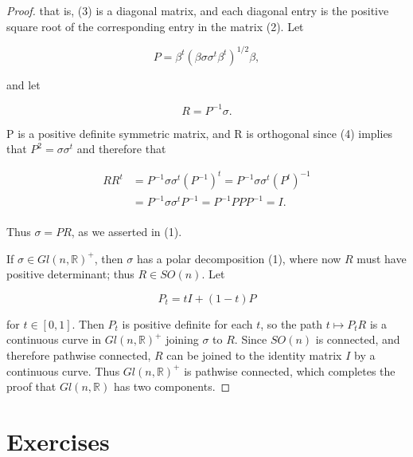 \begin{proof}
that is, (3) is a diagonal matrix, and each diagonal entry is the positive square root of the corresponding entry in the matrix (2). Let

\begin{equation}
\tag{4}\label{eq:3.68:4}
P=\beta^{t}(\beta\sigma\sigma^{t}\beta^{t})^{1/2}\beta,
\end{equation}

and let

\begin{equation}
\tag{5}\label{eq:3.68:5}
R=P^{-1}\sigma.
\end{equation}

P is a positive definite symmetric matrix, and R is orthogonal since (4) implies that  $ P^{2} = \sigma\sigma^{t} $ and therefore that

\begin{equation}
\tag{6}\label{eq:3.68:6}
\begin{aligned}{R R^{t}}&{{}=P^{-1}\sigma\sigma^{t}(P^{-1})^{t}=P^{-1}\sigma\sigma^{t}(P^{t})^{-1}}\\ {}&{{}=P^{-1}\sigma\sigma^{t}P^{-1}=P^{-1}P P P^{-1}=I.}\\ \end{aligned}
\end{equation}

Thus  $ \sigma = PR $, as we asserted in (1).

If $\sigma \in Gl(n, \mathbb{R})^+$, then $\sigma$ has a polar decomposition (1), where now $R$ must have positive determinant; thus $R \in SO(n)$. Let

\begin{equation}
\tag{7}\label{eq:3.68:7}
P_{t}=t I+(1-t)P
\end{equation}

for $t \in [0,1]$. Then $P_t$ is positive definite for each $t$, so the path $t \mapsto P_tR$ is a continuous curve in $Gl(n,\mathbb{R})^+$ joining $\sigma$ to $R$. Since $SO(n)$ is connected, and therefore pathwise connected, $R$ can be joined to the identity matrix $I$ by a continuous curve. Thus $Gl(n,\mathbb{R})^+$ is pathwise connected, which completes the proof that $Gl(n,\mathbb{R})$ has two components.

\end{proof}

\section{Exercises}

